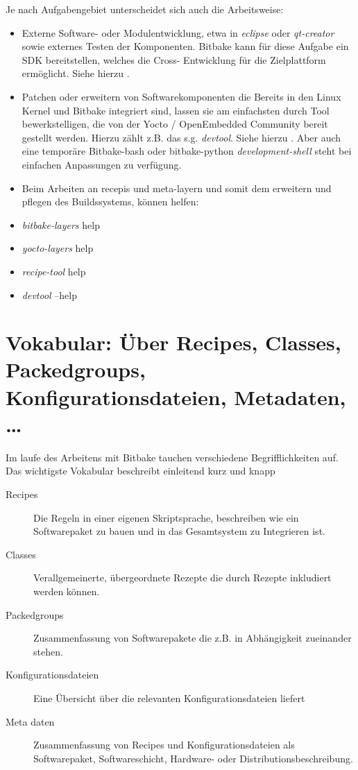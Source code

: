 Je nach Aufgabengebiet unterscheidet sich auch die Arbeitsweise:
\begin{itemize}
    \item Externe Software- oder Modulentwicklung, etwa in \textit{eclipse} oder
        \textit{qt-creator} sowie externes Testen der Komponenten. Bitbake kann
        für diese Aufgabe ein \acl{SDK} bereitstellen, welches die Cross-
        Entwicklung für die Ziel\-plattform ermöglicht. Siehe hierzu
    .
    \item Patchen oder erweitern von Software\-komponenten die Bereits in den
        Linux Kernel und Bitbake integriert sind, lassen sie am einfachsten durch
        Tool bewerkstelligen, die von der Yocto / OpenEmbedded Community bereit
        gestellt werden. Hierzu zählt z.B. das s.g. \textit{devtool}. Siehe
        hierzu . Aber auch eine temporäre
        Bitbake-bash oder bitbake-python \textit{development-shell} steht bei
        einfachen Anpassungen zu verfügung.
    \item Beim Arbeiten an recepis und meta-layern und somit dem erweitern und
        pflegen des Buildssystems, können helfen:
            \item \textit{bitbake-layers} help
            \item \textit{yocto-layers } help
            \item \textit{recipe-tool} help
            \item \textit{devtool } --help

\end{itemize}

\section{Vokabular: Über Recipes, Classes, Packedgroups, Konfigurationsdateien,
Metadaten, \ldots }%
\label{sec:recipes_classes_packedgroups}
Im laufe des Arbeitens mit Bitbake tauchen verschiedene Begrifflichkeiten auf.
Das wichtigste  Vokabular beschreibt einleitend kurz und knapp \cite{PhyTec:Yocto_Manual}

\begin{description}
    \item[Recipes] Die Regeln in einer eigenen Skriptsprache, beschreiben wie
        ein Softwarepaket zu bauen und in das Gesamtsystem zu Integrieren ist.
    \item[Classes] Verallgemeinerte, übergeordnete Rezepte die durch Rezepte
        inkludiert werden können.
    \item[Packedgroups] Zusammenfassung von Softwarepakete die z.B. in
        Abhängigkeit zueinander stehen.
    \item[Konfigurationsdateien] Eine Übersicht über die relevanten
        Konfigurationsdateien liefert
        \cite[Seite 19, 20]{Gonzalez2018:Embedded_Linux_Development_Using_Yocto_Project_Cookbook_2nd}
    \item[Meta daten] Zusammenfassung von Recipes und Konfigurationsdateien als
        Softwarepaket, Softwareschicht, Hardware- oder
        Distributions\-beschreibung.
\end{description}
